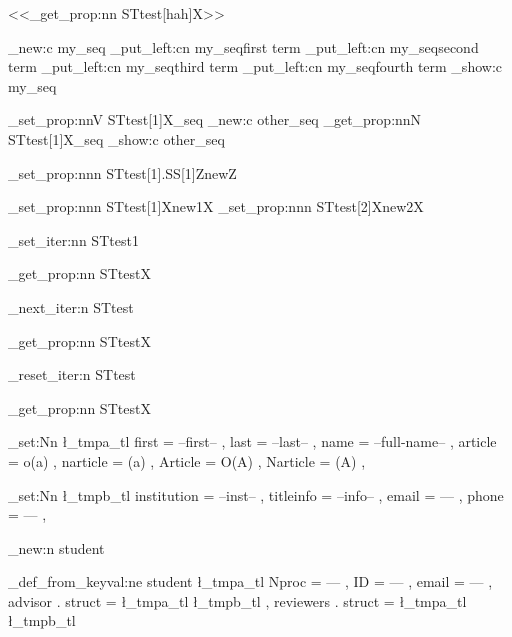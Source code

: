 \documentclass[dctools,english]{ufrgscca}
\begin{document}

        <<\starray_get_prop:nn {STtest[hah]}{X}>>\par

        \seq_new:c {my_seq}
        \seq_put_left:cn {my_seq}{first term}
        \seq_put_left:cn {my_seq}{second term}
        \seq_put_left:cn {my_seq}{third term}
        \seq_put_left:cn {my_seq}{fourth term}
        \seq_show:c {my_seq}

        \starray_set_prop:nnV {STtest[1]}{X}{\my_seq}
        \seq_new:c {other_seq}
        \starray_get_prop:nnN {STtest[1]}{X}\other_seq
        \seq_show:c {other_seq}



        \starray_set_prop:nnn {STtest[1].SS[1]}{Z}{newZ}

        \starray_set_prop:nnn {STtest[1]}{X}{new1X}
        \starray_set_prop:nnn {STtest[2]}{X}{new2X}


        \starray_set_iter:nn {STtest}{1}


        \starray_get_prop:nn {STtest}{X}\par

        \starray_next_iter:n {STtest}

        \starray_get_prop:nn {STtest}{X}
        \par
        \starray_reset_iter:n {STtest}

        \starray_get_prop:nn {STtest}{X}
        \par


        \tl_set:Nn \l_tmpa_tl {
          first = --first-- ,
          last = --last-- ,
          name = --full-name-- ,
          article = o(a) ,
          narticle = (a) ,
          Article = O(A) ,
          Narticle = (A) ,
        }

        \tl_set:Nn \l_tmpb_tl {
          institution = --inst-- ,
          titleinfo = --info-- ,
          email = --- ,
          phone = --- ,
        }

        \starray_new:n {student}



        \starray_def_from_keyval:ne {student}
        {
          \l_tmpa_tl
          Nproc = --- ,
          ID = --- ,
          email = --- ,
          advisor . struct = {
            \l_tmpa_tl
            \l_tmpb_tl
          } ,
          reviewers . struct = {
            \l_tmpa_tl
            \l_tmpb_tl
          }
        }
\end{document}
